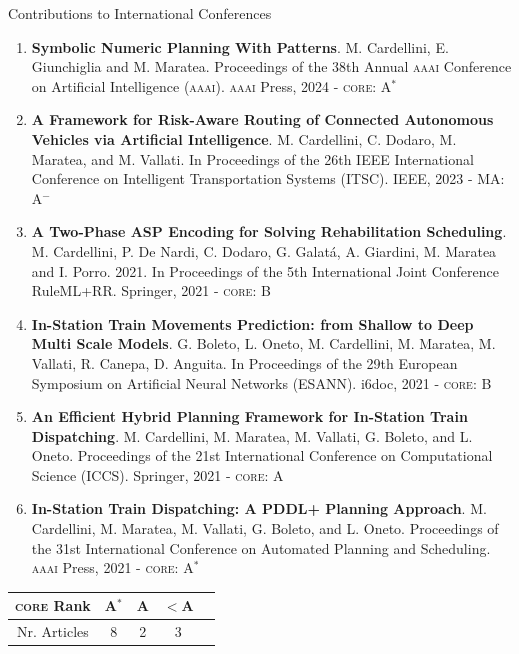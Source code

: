 \documentclass{resume} %
\begin{document}
\begin{rSection}{Contributions to International Conferences}
\begin{enumerate}[leftmargin=5mm]
	\item[C6] \textbf{Symbolic Numeric Planning With Patterns}. M. Cardellini, E. Giunchiglia and M. Maratea. Proceedings of the 38th Annual \textsc{aaai} Conference on Artificial Intelligence (\textsc{aaai}). \textsc{aaai} Press, 2024 - \textsc{core}: A$^{*}$
	
	\item[C5] \textbf{A Framework for Risk-Aware Routing of Connected Autonomous Vehicles via Artificial Intelligence}. M. Cardellini, C. Dodaro, M. Maratea, and M. Vallati. In Proceedings of the 26th IEEE International Conference on Intelligent Transportation Systems (ITSC). IEEE, 2023 - MA: A$^-$
	
	\item[C4] \textbf{A Two-Phase ASP Encoding for Solving Rehabilitation Scheduling}. M. Cardellini, P. De Nardi, C. Dodaro, G. Galat\'a, A. Giardini, M. Maratea and I. Porro. 2021. In Proceedings of the 5th International Joint Conference RuleML+RR. Springer, 2021 - \textsc{core}: B
	
	
	\item[C3] \textbf{In-Station Train Movements Prediction: from Shallow to Deep Multi Scale Models}. G. Boleto, L. Oneto, M. Cardellini, M. Maratea, M. Vallati, R. Canepa, D. Anguita. In Proceedings of the 29th European Symposium on Artificial Neural Networks (ESANN). i6doc, 2021 - \textsc{core}: B
	
	\item[C2] \textbf{An Efficient Hybrid Planning Framework for In-Station Train Dispatching}. M. Cardellini, M. Maratea, M. Vallati, G. Boleto, and L. Oneto. Proceedings of the 21st International Conference on Computational Science (ICCS). Springer, 2021 - \textsc{core}: A
	
	\item[C1] \textbf{In-Station Train Dispatching: A PDDL+ Planning Approach}. M. Cardellini, M. Maratea, M. Vallati, G. Boleto, and L. Oneto. Proceedings of the 31st International Conference on Automated Planning and Scheduling. \textsc{aaai} Press, 2021 - \textsc{core}: A$^{*}$
\end{enumerate}
\begin{center}
\begin{tabular}{|c||c|c|c|c|}
	\hline
\textsc{core} Rank&A$^{*}$  & A & $<$A \\ \hline
Nr. Articles&8  & 2 & 3 \\ \hline
\end{tabular}%
\end{center}
\end{rSection}
\end{document}

